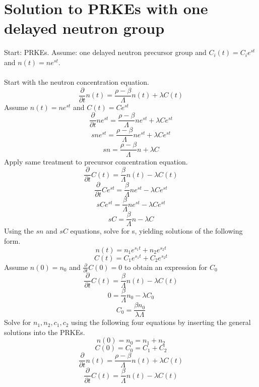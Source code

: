 \documentclass[]{article}
\begin{document}
		\section*{\textbf{Solution to PRKEs with one delayed neutron group}} 
		Start: PRKEs. Assume: one delayed neutron precursor group and $C_i(t) =C_ie^{st}$ and $n(t) =ne^{st}$.\\\\
		Start with the neutron concentration equation.
		\[
		\frac{\partial}{\partial t}n(t)= \frac{\rho-\beta}{\Lambda}n(t)+\lambda C(t)
		\]
		Assume $n(t) =ne^{st}$ and $C(t) =Ce^{st}$
		\[
		\frac{\partial}{\partial t}ne^{st}= \frac{\rho-\beta}{\Lambda}ne^{st}+\lambda Ce^{st}
		\]
		\[
		sne^{st}= \frac{\rho-\beta}{\Lambda}ne^{st}+\lambda Ce^{st}
		\]
		\[
		sn= \frac{\rho-\beta}{\Lambda}n+\lambda C
		\]
		Apply same treatment to precursor concentration equation.
		\[
		\frac{\partial}{\partial t}C(t) =\frac{\beta}{\Lambda}n(t)-\lambda C(t)
		\]
		\[
		\frac{\partial}{\partial t}Ce^{st} =\frac{\beta}{\Lambda}ne^{st}-\lambda Ce^{st}
		\]
		\[
		sCe^{st} =\frac{\beta}{\Lambda}ne^{st}-\lambda Ce^{st}
		\]
		\[
		sC =\frac{\beta}{\Lambda}n-\lambda C
		\]
		Using the $sn$ and $sC$ equations, solve for s, yielding solutions of the following form.
		\[
		n(t) = n_1e^{s_1t}+n_2e^{s_2t}
		\]
		\[
		C(t) = C_1e^{s_1t}+C_2e^{s_2t}
		\]
		Assume $n(0) = n_0$ and $\frac{\partial}{\partial t}C(0)=0$ to obtain an expression for $C_0$
		\[
		\frac{\partial}{\partial t}C(t) =\frac{\beta}{\Lambda}n(t)-\lambda C(t)
		\]
		\[
		0 =\frac{\beta}{\Lambda}n_0-\lambda C_0
		\]
		\[
		C_0 =\frac{\beta n_0}{\lambda\Lambda}
		\]
		Solve for $n_1, n_2, c_1, c_2$ using the following four equations by inserting the general solutions into the PRKEs.
		\[
		n(0)=n_0 = n_1+n_2
		\]
		\[
		C(0)=C_0 = C_1+C_2
		\]
		\[
		\frac{\partial}{\partial t}n(t)= \frac{\rho-\beta}{\Lambda}n(t)+\lambda C(t)
		\]
		\[
		\frac{\partial}{\partial t}C(t) =\frac{\beta}{\Lambda}n(t)-\lambda C(t)
		\]
			
\end{document}
